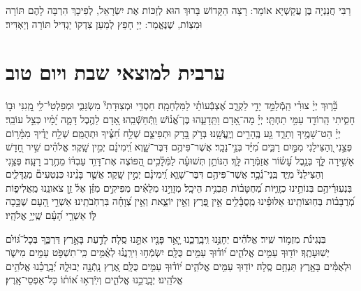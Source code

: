 \documentclass[twoside, openany, parskip=half, 11pt]{book}
\begin{document}

רַבִּי חֲנַנְיָה בֶּן עֲקַשְׁיָא אוֹמֵר: 
רָצָה הַקָּדוֹשׁ בָּרוּךְ הוּא לְזַכּוֹת אֶת יִשְׂרָאֵל, לְפִיכָךְ הִרְבָּה לָהֶם תּוֹרָה וּמִצְוֹת, 
שֶׁנֶּאֱמַר: יְיָ חָפֵץ לְמַעַן צִדְקוֹ יַגְדִּיל תּוֹרָה וְיַאְדִּיר׃


\mournerskaddish




\vfill
{}\quad{}\quad{}





\chapter[ערבית למוצאי שבת ויום טוב]{  ערבית למוצאי שבת ויום טוב }

 בָּ֘ר֤וּךְ יְיָ֨ צוּרִ֗י הַֽמְֿלַמֵּ֣ד יָדַ֣י לַקְרָ֑ב אֶ֝צְבְּֿעוֹתַ֗י לַמִּלְחָמָֽה׃ 
חַסְדִּ֥י וּמְצֽוּדָתִי֘ מִשְׂגַּבִּ֢י וּמְפַלְטִי֫־לִ֥י מָֽ֭גִנִּי וּב֣וֹ חָסִ֑יתִי הָֽרוֹדֵ֖ד עַמִּ֣י תַחְתָּֽי׃ 
יְיָ֗ מָה־אָ֭דָם וַתֵּֽדָעֵ֑הוּ בֶּן־אֱ֝נ֗וֹשׁ וַֽתְּֿחַשְּֿׁבֵֽהוּ׃ 
אָ֭דָם לַהֶ֣בֶל דָּמָ֑ה יָ֝מָ֗יו כְּצֵ֣ל עוֹבֵֽר׃ 
יְיָ֗ הַט־שָׁמֶ֥יךָ וְתֵרֵ֑ד גַּ֖ע בֶּֽהָרִ֣ים וְיֶֽעֱשָֽׁנוּ׃ 
בְּרֹ֣ק בָּ֭רָק וּתְפִיצֵ֑ם שְׁלַ֥ח חִ֝צֶּ֗יךָ וּתְהֻמֵּֽם׃ 
שְׁלַ֥ח יָדֶ֗יךָ מִמָּ֫ר֥וֹם פְּצֵ֣נִי וְ֭הַצִּילֵנִי מִמַּ֣יִם רַבִּ֑ים מִ֝יַּ֗ד בְּנֵ֣י־נֵכָֽר׃ 
אֲשֶׁר־פִּיהֶ֥ם דִּבֶּר־שָׁ֑וְא וִֽ֝ימִינָ֗ם יְמִ֣ין שָֽׁקֶר׃ 
אֱלֹהִ֗ים שִׁ֣יר חָ֭דָשׁ אָשִׁ֣ירָה לָּ֑ךְ בְּנֵ֥בֶל עָ֝שׂ֗וֹר אֲזַמְּֿרָה לָּֽךְ׃ 
הַנּוֹתֵ֥ן תְּשׁוּעָ֗ה לַמְּֿלָ֫כִ֥ים הַ֭פּוֹצֶה אֶת־דָּוִ֥ד עַבְדּ֗וֹ מֵחֶ֥רֶב רָעָֽה׃ 
פְּצֵ֥נִי וְהַצִּילֵנִי֘ מִיַּ֢ד בְּֽנֵי־נֵ֫כָ֥ר׃ 
אֲשֶׁר־פִּיהֶ֥ם דִּבֶּר־שָׁוְ֑א וִֽ֝ימִינָ֗ם יְמִ֣ין שָֽׁקֶר׃ 
אֲשֶׁ֤ר בָּנֵ֨ינוּ כִּנְטִעִים֘ מְגֻדָּלִ֢ים בִּנְעֽוּרֵ֫יהֶ֥ם בְּנוֹתֵ֥ינוּ כְזָֽוִ֑יּוֹת מְ֝חֻטָּב֗וֹת תַּבְנִ֥ית הֵיכָֽל׃ 
מְזָוֵי֣נוּ מְלֵאִ֗ים מְפִיקִ֥ים מִזַּ֗ן אֶל֫ זַ֥ן צֹאונֵֽנוּ מַֽאֲלִיפ֑וֹת מְ֝רֻבָּב֗וֹת בְּחֽוּצוֹתֵֽינוּ׃ 
אַלּוּפֵ֗ינוּ מְֽסֻבָּ֫לִ֥ים אֵ֣ין פֶּ֭רֶץ וְאֵ֣ין יוֹצֵ֑את וְאֵ֥ין צְ֝וָחָ֗ה בִּרְחֹֽבֹתֵֽינוּ׃ 
אַשְׁרֵ֣י הָ֭עָם שֶׁכָּ֣כָה לּ֑וֹ אַשְׁרֵ֥י הָ֝עָ֗ם שֶֽׁיְיָ֥ אֱלֹהָֽיו׃



  בִּנְגִינֹ֗ת מִזְמ֥וֹר שִֽׁיר׃ 
אֱלֹהִ֗ים יְחָנֵּ֥נוּ וִֽיבָֽרֲכֵ֑נוּ יָ֤אֵ֥ר פָּנָ֖יו אִתָּ֣נוּ סֶֽלָה׃ 
לָדַ֣עַת בָּאָ֣רֶץ דַּרְכֶּ֑ךָ בְּכָל־גּ֝וֹיִ֗ם יְשֽׁוּעָתֶֽךָ׃ 
יוֹד֖וּךָ עַמִּ֥ים אֱלֹהִ֑ים י֝וֹד֗וּךָ עַמִּ֥ים כֻּלָּֽם׃ 
יִשְׂמְֿח֥וּ וִירַֽנֲנ֗וּ לְאֻ֫מִּ֥ים כִּֽי־תִשְׁפֹּ֣ט עַמִּ֣ים מִישֹׁ֑ר 
וּלְאֻמִּ֓ים בָּאָ֖רֶץ תַּנְחֵ֣ם סֶֽלָה׃ 
יוֹד֖וּךָ עַמִּ֥ים אֱלֹהִ֑ים י֝וֹד֗וּךָ עַמִּ֥ים כֻּלָּֽם׃ 
אֶ֭רֶץ נָֽתְֿנָ֣ה יְבוּלָ֑הּ יְ֝בָֽרֲכֵ֗נוּ אֱלֹהִ֥ים אֱלֹהֵֽינוּ׃ 
יְבָֽרֲכֵ֥נוּ אֱלֹהִ֑ים וְיִֽיֿרְא֥וּ א֝וֹת֗וֹ כָּל־אַפְסֵי־אָֽרֶץ׃
\end{document}
